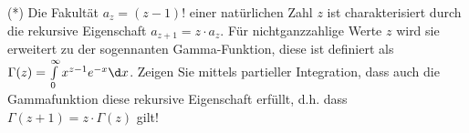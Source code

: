 \item (*) Die Fakultät $a_z = (z-1)!$ einer natürlichen Zahl  $z$ ist charakterisiert durch die rekursive Eigenschaft $a_{z+1} = z\cdot a_z$. Für nichtganzzahlige Werte $z$ wird sie erweitert zu der sogennanten Gamma-Funktion, diese ist definiert als $\Gamma(z) = \int\limits_0^\infty x^{z-1} e^{-x} \d x$. Zeigen Sie mittels partieller Integration, dass auch die Gammafunktion diese rekursive Eigenschaft erfüllt, d.h. dass $\Gamma(z+1) = z \cdot \Gamma(z)$ gilt!
